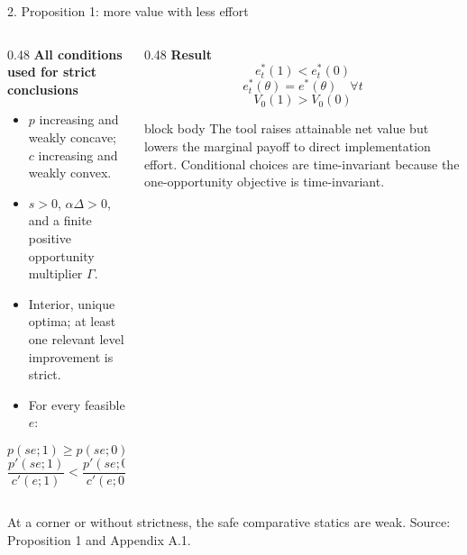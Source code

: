\documentclass[aspectratio=169,11pt]{beamer}
\newcommand{\keybox}[1]{%
  \begin{beamercolorbox}[rounded=true,sep=0.8ex]{block body}
    #1
  \end{beamercolorbox}%
}
\begin{document}
\begin{frame}{2. Proposition 1: more value with less effort}
  \begin{columns}[T,onlytextwidth]
    \begin{column}{0.48\textwidth}
      {\color{Teal}\textbf{All conditions used for strict conclusions}}
      \begin{itemize}\small
        \item \(p\) increasing and weakly concave; \(c\) increasing and weakly convex.
        \item \(s>0\), \(\alpha\Delta>0\), and a finite positive opportunity multiplier
          \(\Gamma\).
        \item Interior, unique optima; at least one relevant level improvement is strict.
        \item For every feasible \(e\):
      \end{itemize}
      \vspace{-0.35cm}
      \[
        p(se;1)\ge p(se;0),\qquad c(e;1)\le c(e;0),
      \]
      \vspace{-0.35cm}
      \[
        \frac{p'(se;1)}{c'(e;1)}<
        \frac{p'(se;0)}{c'(e;0)}\quad(e>0).
      \]
    \end{column}
    \begin{column}{0.48\textwidth}
      {\color{Teal}\textbf{Result}}
      \[
        \boxed{e_t^*(1)<e_t^*(0)}
      \]
      \[
        \boxed{e_t^*(\theta)=e^*(\theta)\quad\forall t}
      \]
      \[
        \boxed{V_0(1)>V_0(0)}
      \]
      \keybox{\small The tool raises attainable net value but lowers the marginal payoff
      to direct implementation effort. Conditional choices are time-invariant because the
      one-opportunity objective is time-invariant.}
    \end{column}
  \end{columns}
  \vfill
  {\color{Muted}\scriptsize At a corner or without strictness, the safe comparative statics
  are weak. Source: Proposition 1 and Appendix A.1.}
\end{frame}
\end{document}
